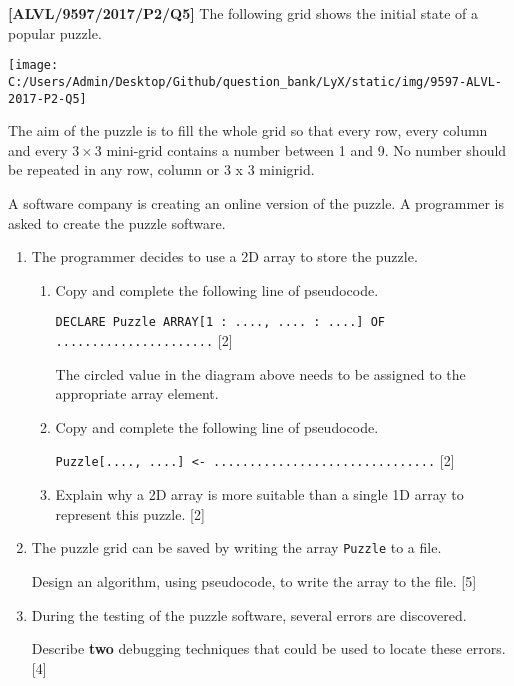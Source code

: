 \item \textbf{{[}ALVL/9597/2017/P2/Q5{]} }The following grid shows the initial
state of a popular puzzle.
\begin{center}
\texttt{[image: C:/Users/Admin/Desktop/Github/question\_bank/LyX/static/img/9597-ALVL-2017-P2-Q5]}
\par\end{center}

The aim of the puzzle is to fill the whole grid so that every row,
every column and every $3\times3$ mini-grid contains a number between
1 and 9. No number should be repeated in any row, column or 3 x 3
minigrid. 

A software company is creating an online version of the puzzle. A
programmer is asked to create the puzzle software. 
\begin{enumerate}
\item The programmer decides to use a 2D array to store the puzzle.
\begin{enumerate}
\item Copy and complete the following line of pseudocode. 

\texttt{DECLARE Puzzle ARRAY{[}1 : ...., .... : ....{]} OF ......................}
\hfill{}{[}2{]}

The circled value in the diagram above needs to be assigned to the
appropriate array element. 
\item Copy and complete the following line of pseudocode. 

\texttt{Puzzle{[}...., ....{]} <- ...............................}
\hfill{}{[}2{]}
\item Explain why a 2D array is more suitable than a single 1D array to
represent this puzzle. \hfill{}{[}2{]}
\end{enumerate}
\item The puzzle grid can be saved by writing the array \texttt{Puzzle}
to a file. 

Design an algorithm, using pseudocode, to write the array to the file.
\hfill{} {[}5{]}
\item During the testing of the puzzle software, several errors are discovered. 

Describe \textbf{two} debugging techniques that could be used to locate
these errors. \hfill{}{[}4{]}
\end{enumerate}